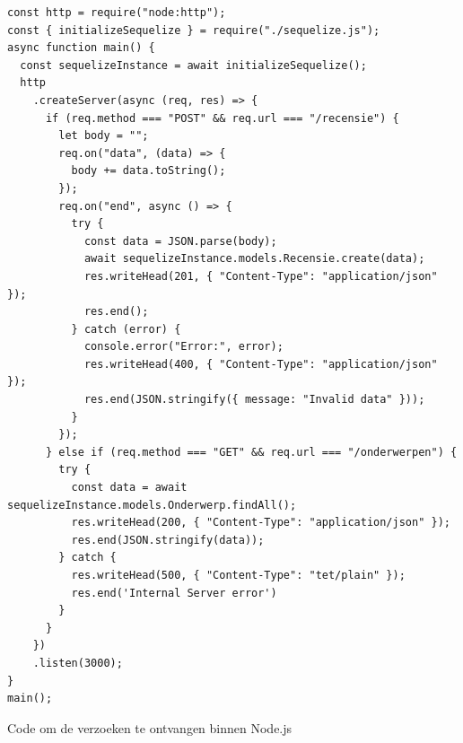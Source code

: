 \begin{listing}[H]
  \centering
  \begin{verbatim}
const http = require("node:http");
const { initializeSequelize } = require("./sequelize.js");
async function main() {
  const sequelizeInstance = await initializeSequelize();
  http
    .createServer(async (req, res) => {
      if (req.method === "POST" && req.url === "/recensie") {
        let body = "";
        req.on("data", (data) => {
          body += data.toString(); 
        });
        req.on("end", async () => {
          try {
            const data = JSON.parse(body);
            await sequelizeInstance.models.Recensie.create(data);
            res.writeHead(201, { "Content-Type": "application/json" });
            res.end();
          } catch (error) {
            console.error("Error:", error);
            res.writeHead(400, { "Content-Type": "application/json" });
            res.end(JSON.stringify({ message: "Invalid data" }));
          }
        });
      } else if (req.method === "GET" && req.url === "/onderwerpen") {
        try {
          const data = await sequelizeInstance.models.Onderwerp.findAll();
          res.writeHead(200, { "Content-Type": "application/json" });
          res.end(JSON.stringify(data));
        } catch {
          res.writeHead(500, { "Content-Type": "tet/plain" });
          res.end('Internal Server error')
        }
      }
    })
    .listen(3000);
}
main();
\end{verbatim}
\caption[Ontvangen van verzoeken in Node.js]{\label{code:NodeServer}Code om de verzoeken te ontvangen binnen Node.js}
\end{listing}
